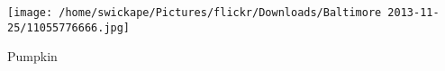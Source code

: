\documentclass[10pt,letterpaper]{article}
\begin{document}
\texttt{[image: /home/swickape/Pictures/flickr/Downloads/Baltimore 2013-11-25/11055776666.jpg]}

Pumpkin\\
\pagebreak
\end{document}
